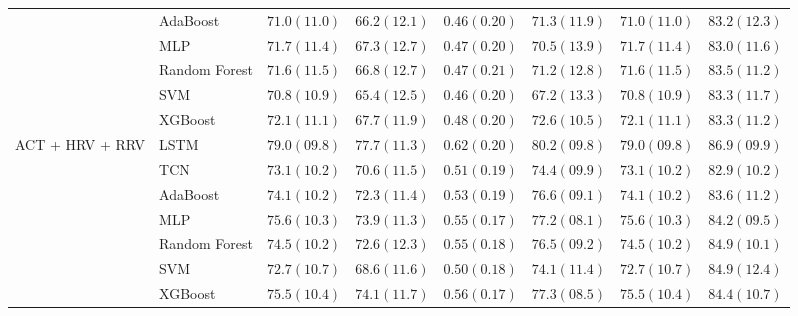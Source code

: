 \begin{tabular}{llllllll}
 & AdaBoost & $71.0 (11.0)$ & $66.2 (12.1)$ & $0.46 (0.20)$ & $71.3 (11.9)$ & $71.0 (11.0)$ & $83.2 (12.3)$ \\
 & MLP & $71.7 (11.4)$ & $67.3 (12.7)$ & $0.47 (0.20)$ & $70.5 (13.9)$ & $71.7 (11.4)$ & $83.0 (11.6)$ \\
 & Random Forest & $71.6 (11.5)$ & $66.8 (12.7)$ & $0.47 (0.21)$ & $71.2 (12.8)$ & $71.6 (11.5)$ & $83.5 (11.2)$ \\
 & SVM & $70.8 (10.9)$ & $65.4 (12.5)$ & $0.46 (0.20)$ & $67.2 (13.3)$ & $70.8 (10.9)$ & $83.3 (11.7)$ \\
 & XGBoost & $72.1 (11.1)$ & $67.7 (11.9)$ & $0.48 (0.20)$ & $72.6 (10.5)$ & $72.1 (11.1)$ & $83.3 (11.2)$ \\
\multirow[c]{7}{*}{ACT + HRV + RRV} & LSTM & $79.0 (09.8)$ & $77.7 (11.3)$ & $0.62 (0.20)$ & $80.2 (09.8)$ & $79.0 (09.8)$ & $86.9 (09.9)$ \\
 & TCN & $73.1 (10.2)$ & $70.6 (11.5)$ & $0.51 (0.19)$ & $74.4 (09.9)$ & $73.1 (10.2)$ & $82.9 (10.2)$ \\
 & AdaBoost & $74.1 (10.2)$ & $72.3 (11.4)$ & $0.53 (0.19)$ & $76.6 (09.1)$ & $74.1 (10.2)$ & $83.6 (11.2)$ \\
 & MLP & $75.6 (10.3)$ & $73.9 (11.3)$ & $0.55 (0.17)$ & $77.2 (08.1)$ & $75.6 (10.3)$ & $84.2 (09.5)$ \\
 & Random Forest & $74.5 (10.2)$ & $72.6 (12.3)$ & $0.55 (0.18)$ & $76.5 (09.2)$ & $74.5 (10.2)$ & $84.9 (10.1)$ \\
 & SVM & $72.7 (10.7)$ & $68.6 (11.6)$ & $0.50 (0.18)$ & $74.1 (11.4)$ & $72.7 (10.7)$ & $84.9 (12.4)$ \\
 & XGBoost & $75.5 (10.4)$ & $74.1 (11.7)$ & $0.56 (0.17)$ & $77.3 (08.5)$ & $75.5 (10.4)$ & $84.4 (10.7)$ \\
\end{tabular}
